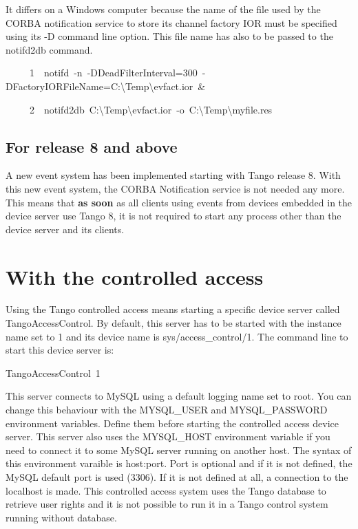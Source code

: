 It differs on a Windows computer because the name of the file used
by the CORBA notification service to store its channel factory IOR
must be specified using its -D command line option. This file name
has also to be passed to the notifd2db command.


\begin{lyxcode}
~~~~~1~~notifd~-n~-DDeadFilterInterval=300~-DFactoryIORFileName=C:\textbackslash{}Temp\textbackslash{}evfact.ior~\&

~~~~~2~~notifd2db~C:\textbackslash{}Temp\textbackslash{}evfact.ior~-o~C:\textbackslash{}Temp\textbackslash{}myfile.res
\end{lyxcode}


\subsection{For release 8 and above}

A new event system has been implemented starting with Tango release
8. With this new event system, the CORBA Notification service is not
needed any more. This means that \textbf{as soon} as all clients using
events from devices embedded in the device server use Tango 8, it
is not required to start any process other than the device server
and its clients.

\section{With the controlled access}

Using the Tango controlled access means starting a specific device
server called TangoAccessControl. By default,
this server has to be started with the instance name set to \textquotedbl{}1\textquotedbl{}
and its device name is \textquotedbl{}sys/access\_control/1\textquotedbl{}.
The command line to start this device server is:
\begin{lyxcode}
TangoAccessControl~1
\end{lyxcode}
This server connects to MySQL using a default logging name set to
\textquotedbl{}root\textquotedbl{}. You can change this behaviour
with the MYSQL\_USER and MYSQL\_PASSWORD
environment variables. Define them before starting the controlled
access device server. This server also uses the MYSQL\_HOST
environment variable if you need to connect it to some MySQL server
running on another host. The syntax of this environment varaible is
\textquotedbl{}host:port\textquotedbl{}. Port is optional and if it
is not defined, the MySQL default port is used (3306). If it is not
defined at all, a connection to the localhost is made. This controlled
access system uses the Tango database to retrieve user rights and
it is not possible to run it in a Tango control system running without
database.
